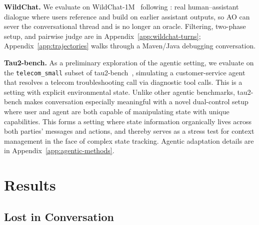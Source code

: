 \documentclass{article}
\begin{document}
\noindent\textbf{WildChat.}
We evaluate on WildChat-1M~\citep{zhao2024wildchat} following \citet{huang2026context}: real human--assistant dialogue where users reference and build on earlier assistant outputs, so AO can sever the conversational thread and is no longer an oracle. Filtering, two-phase setup, and pairwise judge are in Appendix~\ref{app:wildchat-turns}; Appendix~\ref{app:trajectories} walks through a Maven/Java debugging conversation.

\noindent\textbf{Tau2-bench.}
As a preliminary exploration of the agentic setting, we evaluate on the \texttt{telecom\_small} subset of tau2-bench~\citep{yao2024tau}, simulating a customer-service agent that resolves a telecom troubleshooting call via diagnostic tool calls. This is a setting with explicit environmental state. Unlike other agentic benchmarks, tau2-bench makes conversation especially meaningful with a novel dual-control setup where user and agent are both capable of manipulating state with unique capabilities. This forms a setting where state information organically lives across both parties' messages and actions, and thereby serves as a stress test for context management in the face of complex state tracking. Agentic adaptation details are in Appendix~\ref{app:agentic-methods}.

\section{Results}
\label{sec:results}

\subsection{Lost in Conversation}
\label{sec:lic-results}
\end{document}
